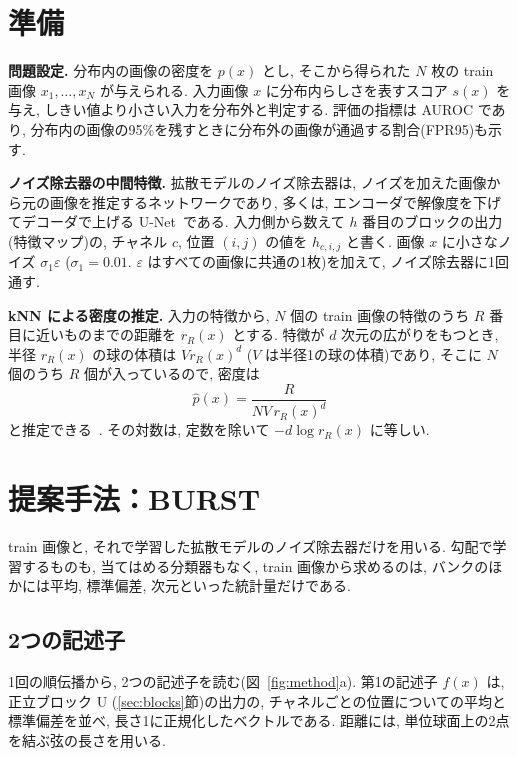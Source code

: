 \documentclass[MIRU,submit]{miru2025j}
\newcommand{\method}{BURST}               %
\begin{document}
\section{準備}
\label{sec:prep}
\textbf{問題設定.} 分布内の画像の密度を $p(x)$ とし, そこから得られた $N$ 枚の train 画像 $x_1,\ldots,x_N$ が与えられる. 入力画像 $x$ に分布内らしさを表すスコア $s(x)$ を与え, しきい値より小さい入力を分布外と判定する. 評価の指標は AUROC であり, 分布内の画像の95\%を残すときに分布外の画像が通過する割合(FPR95)も示す.

\textbf{ノイズ除去器の中間特徴.} 拡散モデルのノイズ除去器は, ノイズを加えた画像から元の画像を推定するネットワークであり, 多くは, エンコーダで解像度を下げてデコーダで上げる U-Net~\cite{ronneberger2015unet}である. 入力側から数えて $h$ 番目のブロックの出力(特徴マップ)の, チャネル $c$, 位置 $(i,j)$ の値を $h_{c,i,j}$ と書く. 画像 $x$ に小さなノイズ $\sigma_1\varepsilon$ ($\sigma_1=0.01$. $\varepsilon$ はすべての画像に共通の1枚)を加えて, ノイズ除去器に1回通す.

\textbf{kNN による密度の推定.} 入力の特徴から, $N$ 個の train 画像の特徴のうち $R$ 番目に近いものまでの距離を $r_R(x)$ とする. 特徴が $d$ 次元の広がりをもつとき, 半径 $r_R(x)$ の球の体積は $V r_R(x)^{d}$ ($V$ は半径1の球の体積)であり, そこに $N$ 個のうち $R$ 個が入っているので, 密度は
\begin{equation}
\hat{p}(x)=\frac{R}{N V\, r_R(x)^{d}}
\label{eq:knn}
\end{equation}
と推定できる~\cite{loftsgaarden1965knn}. その対数は, 定数を除いて $-d\log r_R(x)$ に等しい.

\section{提案手法：\method}
\label{sec:method}
train 画像と, それで学習した拡散モデルのノイズ除去器だけを用いる. 勾配で学習するものも, 当てはめる分類器もなく, train 画像から求めるのは, バンクのほかには平均, 標準偏差, 次元といった統計量だけである.

\subsection{2つの記述子}
1回の順伝播から, 2つの記述子を読む(図~\ref{fig:method}a). 第1の記述子 $f(x)$ は, 正立ブロック U (\ref{sec:blocks}節)の出力の, チャネルごとの位置についての平均と標準偏差を並べ, 長さ1に正規化したベクトルである. 距離には, 単位球面上の2点を結ぶ弦の長さを用いる.
\end{document}
